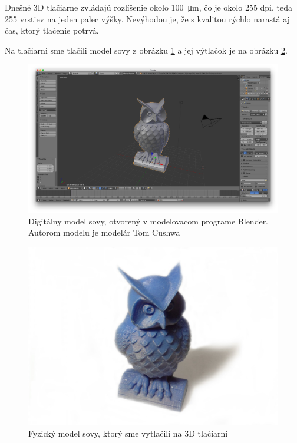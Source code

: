 Dnešné 3D tlačiarne zvládajú rozlíšenie okolo \SI{100}{\micro\metre}, čo je okolo 255 dpi, teda 255 vrstiev na jeden palec výšky. Nevýhodou je, že s kvalitou rýchlo narastá aj čas, ktorý tlačenie potrvá.

Na tlačiarni sme tlačili model sovy z obrázku \ref{sova-blend} a jej výtlačok je na obrázku \ref{sova-print}.

\begin{figure}[h]
 \centering
 \includegraphics[max width=\textwidth]{pictures/owl-blender.png}
 \caption{Digitálny model sovy, otvorený v modelovacom programe Blender. Autorom modelu je modelár Tom Cushwa \cite{Cushwa}}
 \label{sova-blend}
 \end{figure}

\begin{figure}[h]
 \centering
 \includegraphics[max width=\textwidth]{pictures/owl-model.jpg}
 \caption{Fyzický model sovy, ktorý sme vytlačili na 3D tlačiarni}
 \label{sova-print}
 \end{figure}

